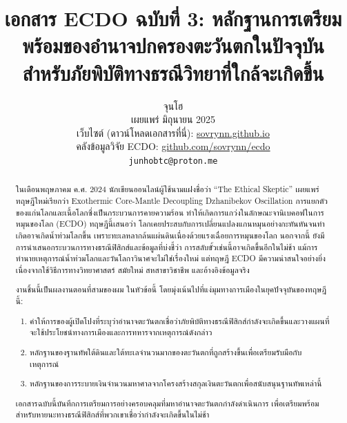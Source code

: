 \documentclass[10pt,twocolumn,letterpaper]{article}
\begin{document}
\title{เอกสาร ECDO ฉบับที่ 3: หลักฐานการเตรียมพร้อมของอำนาจปกครองตะวันตกในปัจจุบันสำหรับภัยพิบัติทางธรณีวิทยาที่ใกล้จะเกิดขึ้น}

\author{จุนโฮ\\
เผยแพร่ มิถุนายน 2025\\
เว็บไซต์ (ดาวน์โหลดเอกสารที่นี่): \href{https://sovrynn.github.io}{sovrynn.github.io}\\
คลังข้อมูลวิจัย ECDO: \href{https://github.com/sovrynn/ecdo}{github.com/sovrynn/ecdo}\\
{\tt\small junhobtc@proton.me}
}
\maketitle

\begin{abstract}
ในเดือนพฤษภาคม ค.ศ. 2024  นักเขียนออนไลน์ผู้ใช้นามแฝงชื่อว่า “The Ethical Skeptic” \cite{0} เผยแพร่ทฤษฎีใหม่เรียกว่า Exothermic Core-Mantle Decoupling Dzhanibekov Oscillation การแยกตัวของแก่นโลกและเนื้อโลกซึ่งเป็นกระบวนการคายความร้อน ทำให้เกิดการแกว่งในลักษณะจานิเบคอฟในการหมุนของโลก (ECDO) \cite{1} ทฤษฎีนี้เสนอว่า โลกเคยประสบกับการเปลี่ยนแปลงแกนหมุนอย่างกะทันหันจนทำเกิดอาจเกิดน้ำท่วมโลกขึ้น เพราะทะเลหลากล้นแผ่นดินเนื่องด้วยแรงเฉื่อยการหมุนของโลก นอกจากนี้ ยังมีการนำเสนอกระบวนการทางธรณีฟิสิกส์และข้อมูลที่บ่งชี้ว่า การสลับขั้วเช่นนี้อาจเกิดขึ้นอีกในไม่ช้า แม้การทำนายเหตุการณ์น้ำท่วมโลกและวันโลกาวินาศจะไม่ใช่เรื่องใหม่ แต่ทฤษฎี ECDO มีความน่าสนใจอย่างยิ่งเนื่องจากใช้วิธีการทางวิทยาศาสตร์ สมัยใหม่ สหสาขาวิชาชีพ และอ้างอิงข้อมูลจริง

งานชิ้นนี้เป็นผลงานตอนที่สามของผม \cite{2,3} ในหัวข้อนี้ โดยมุ่งเน้นไปที่แง่มุมทางการเมืองในยุคปัจจุบันของทฤษฎีนี้:
\begin{flushleft}
\begin{enumerate}
    \item คำให้การของผู้เปิดโปงที่ระบุว่าอำนาจตะวันตกเชื่อว่าภัยพิบัติทางธรณีฟิสิกส์กำลังจะเกิดขึ้นและวางแผนที่จะใช้ประโยชน์ทางการเมืองและการทหารจากเหตุการณ์ดังกล่าว
    \item หลักฐานของฐานทัพใต้ดินและใต้ทะเลจำนวนมากของตะวันตกที่ถูกสร้างขึ้นเพื่อเตรียมรับมือกับเหตุการณ์
    \item หลักฐานของการระบายเงินจำนวนมหาศาลจากโครงสร้างสกุลเงินตะวันตกเพื่อสนับสนุนฐานทัพเหล่านี้
\end{enumerate}
\end{flushleft}
เอกสารฉบับนี้บันทึกการเตรียมการอย่างครอบคลุมที่มหาอำนาจตะวันตกกำลังดำเนินการ เพื่อเตรียมพร้อมสำหรับหายนะทางธรณีฟิสิกส์ที่พวกเขาเชื่อว่ากำลังจะเกิดขึ้นในไม่ช้า
\end{abstract}
\end{document}
